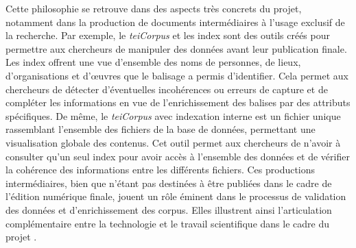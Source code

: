 Cette philosophie se retrouve dans des aspects très concrets du projet, notamment dans la production de documents intermédiaires à l’usage exclusif de la recherche. Par exemple, le \textit{teiCorpus} et les index sont des outils créés pour permettre aux chercheurs de manipuler des données avant leur publication finale. Les index offrent une vue d’ensemble des noms de personnes, de lieux, d’organisations et d’œuvres que le balisage \tei a permis d’identifier. Cela permet aux chercheurs de détecter d’éventuelles incohérences ou erreurs de capture et de compléter les informations en vue de l’enrichissement des balises par des attributs spécifiques.
De même, le \textit{teiCorpus} avec indexation interne est un fichier unique rassemblant l’ensemble des fichiers \tei de la base de données, permettant une visualisation globale des contenus. Cet outil permet aux chercheurs de n’avoir à consulter qu’un seul index pour avoir accès à l’ensemble des données et de vérifier la cohérence des informations entre les différents fichiers. Ces productions intermédiaires, bien que n’étant pas destinées à être publiées dans le cadre de l’édition numérique finale, jouent un rôle éminent dans le processus de validation des données et d’enrichissement des corpus. Elles illustrent ainsi l’articulation complémentaire entre la technologie et le travail scientifique dans le cadre du projet \pense.